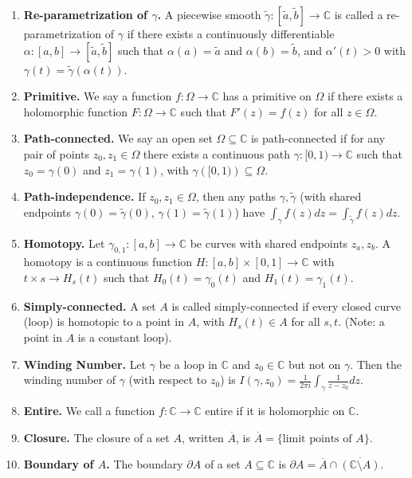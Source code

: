 \documentclass[11pt]{article}
\theoremstyle{definition}
\theoremstyle{named}
\begin{document}
\begin{enumerate}
    \item \textbf{Re-parametrization of $\gamma$. } A piecewise smooth $\tilde{\gamma}: [\tilde{a}, \tilde{b}] \to \mathbb{C}$ is called a re-parametrization of $\gamma$ if there exists a continuously differentiable $\alpha: [a,b] \to [\tilde{a}, \tilde{b}]$ such that $\alpha(a) = \tilde{a}$ and $\alpha(b) = \tilde{b}$, and $\alpha'(t) > 0$ with $\gamma(t) = \tilde{\gamma}(\alpha(t))$. 
    \item \textbf{Primitive. } We say a function $f: \Omega \to \mathbb{C}$ has a primitive on $\Omega$ if there exists a holomorphic function $F: \Omega \to \mathbb{C}$ such that $F'(z) = f(z)$ for all $z \in \Omega$. 
    \item \textbf{Path-connected. } We say an open set $\Omega \subseteq \mathbb{C}$ is path-connected if for any pair of points $z_0, z_1 \in \Omega$ there exists a continuous path $\gamma: [0,1) \to \mathbb{C}$ such that $z_0 = \gamma(0)$ and $z_1 = \gamma(1)$, with $\gamma\left([0,1)\right) \subseteq \Omega$. 
    \item \textbf{Path-independence. } If $z_0,z_1 \in \Omega$, then any paths $\gamma, \tilde{\gamma}$ (with shared endpoints $\gamma(0) = \tilde{\gamma}(0)$, $\gamma(1) = \tilde{\gamma}(1)$) have $\int_{\gamma} f(z) dz = \int_{\tilde{\gamma}} f(z) dz$. 
    \item \textbf{Homotopy. } Let $\gamma_{0,1}: [a,b] \to \mathbb{C}$ be curves with shared endpoints $z_a, z_b$. A homotopy is a continuous function $H: [a,b] \times [0,1] \to \mathbb{C}$ with $t \times s \to H_s(t)$ such that $H_0(t) = \gamma_0(t)$ and $H_1(t) = \gamma_1(t)$. 
    \item \textbf{Simply-connected. } A set $A$ is called simply-connected if every closed curve (loop) is homotopic to a point in $A$, with $H_s(t) \in A$ for all $s,t$. (Note: a point in $A$ is a constant loop). 
    \item \textbf{Winding Number. } Let $\gamma$ be a loop in $\mathbb{C}$ and $z_0 \in \mathbb{C}$ but not on $\gamma$. Then the winding number of $\gamma$ (with respect to $z_0$) is $I(\gamma,z_0) = \frac{1}{2\pi i}\int_{\gamma} \frac{1}{z-z_0} dz$. 
    \item \textbf{Entire. } We call a function $f: \mathbb{C} \to \mathbb{C}$ entire if it is holomorphic on $\mathbb{C}$. 
    \item \textbf{Closure. } The closure of a set $A$, written $\overline{A}$, is $\overline{A} = \{\textrm{limit points of $A$}\}$. 
    \item \textbf{Boundary of $A$. } The boundary $\partial A$ of a set $A \subseteq \mathbb{C}$ is $\partial A = \overline{A} \cap \overline{\left(\mathbb{C} \setminus A\right)}$. 

\end{enumerate}
\end{document}
